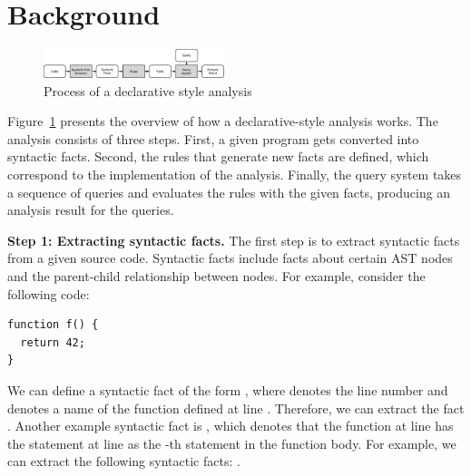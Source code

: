 \section{Background}\label{sec:background} 
\begin{figure}[t]
  \centering
  \vspace{2mm}
  \includegraphics[width=0.47\textwidth]{img/ov1.pdf}
  \caption{Process of a declarative style analysis}
  \label{fig:ov1}
\end{figure}

Figure~\ref{fig:ov1} presents the overview of how a declarative-style
analysis works.  The analysis consists of three steps.  First, a given program
gets converted into syntactic facts.  Second, the rules that generate new facts
are defined, which correspond to the implementation of the analysis.  Finally,
the query system takes a sequence of queries and evaluates the rules with the
given facts, producing an analysis result for the queries.


\textbf{Step 1: Extracting syntactic facts.}
The first step is to extract syntactic facts from a given source code.
Syntactic facts include facts about certain AST nodes and
the parent-child relationship between nodes. For example, consider
the following code:

\begin{lstlisting}[style=mcpp]
function f() {
  return 42;
}
\end{lstlisting}
We can define a syntactic fact of the form , where
 denotes the line number and  denotes a name of the function
defined at line .  Therefore, we can extract the fact .  Another example syntactic fact is , which denotes that the function at line  has the statement
at line  as the -th statement in the function body.  For
example, we can extract the following syntactic facts: .

